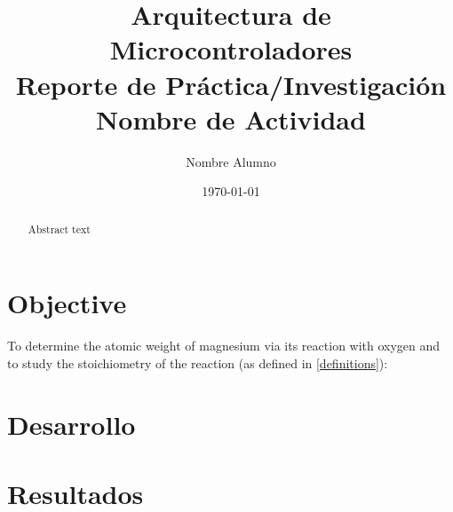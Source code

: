 \documentclass{article}
\title{Arquitectura de Microcontroladores \\ Reporte de Práctica/Investigación \\ Nombre de Actividad} %
\author{Nombre Alumno} %
\date{\today} %
\begin{document}
\maketitle %



 \begin{abstract}
 Abstract text
 \end{abstract}


\section{Objective}

To determine the atomic weight of magnesium via its reaction with oxygen and to study the stoichiometry of the reaction (as defined in \ref{definitions}):





\section{Desarrollo}




\section{Resultados}
\end{document}
